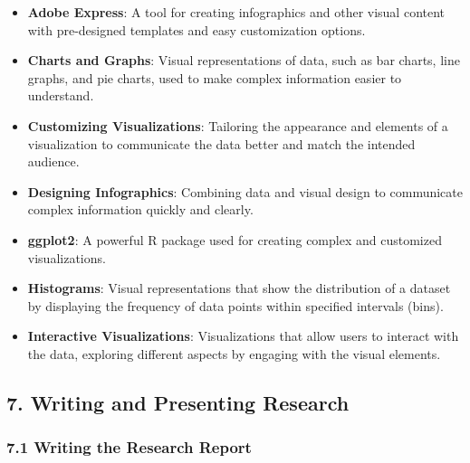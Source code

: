 \documentclass[
]{book}
\providecommand{\tightlist}{%
  \setlength{\itemsep}{0pt}\setlength{\parskip}{0pt}}
\begin{document}
\begin{itemize}
\tightlist
\item
  \textbf{Adobe Express}: A tool for creating infographics and other visual content with pre-designed templates and easy customization options.
\item
  \textbf{Charts and Graphs}: Visual representations of data, such as bar charts, line graphs, and pie charts, used to make complex information easier to understand.
\item
  \textbf{Customizing Visualizations}: Tailoring the appearance and elements of a visualization to communicate the data better and match the intended audience.
\item
  \textbf{Designing Infographics}: Combining data and visual design to communicate complex information quickly and clearly.
\item
  \textbf{ggplot2}: A powerful R package used for creating complex and customized visualizations.
\item
  \textbf{Histograms}: Visual representations that show the distribution of a dataset by displaying the frequency of data points within specified intervals (bins).
\item
  \textbf{Interactive Visualizations}: Visualizations that allow users to interact with the data, exploring different aspects by engaging with the visual elements.
\end{itemize}

\subsection*{\texorpdfstring{7. \textbf{Writing and Presenting Research}}{7. Writing and Presenting Research}}\label{writing-and-presenting-research-1}

\subsubsection*{\texorpdfstring{\textbf{7.1 Writing the Research Report}}{7.1 Writing the Research Report}}\label{writing-the-research-report-1}
\end{document}
